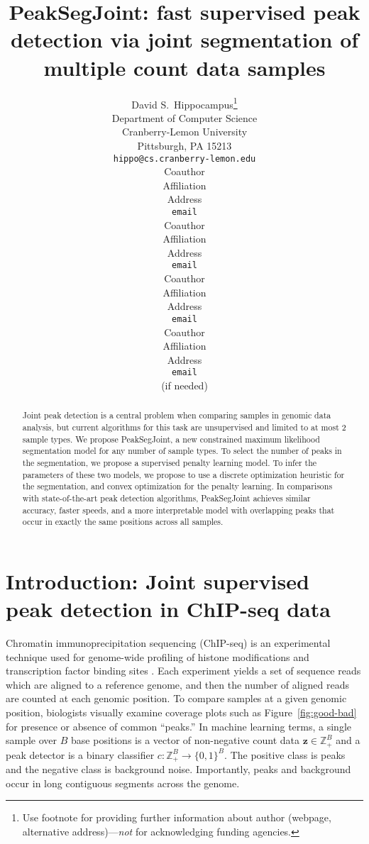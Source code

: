 \documentclass{article} %
\title{PeakSegJoint: fast supervised peak detection via joint
  segmentation of multiple count data samples}
\author{
David S.~Hippocampus\thanks{ Use footnote for providing further information
about author (webpage, alternative address)---\emph{not} for acknowledging
funding agencies.} \\
Department of Computer Science\\
Cranberry-Lemon University\\
Pittsburgh, PA 15213 \\
\texttt{hippo@cs.cranberry-lemon.edu} \\
\And
Coauthor \\
Affiliation \\
Address \\
\texttt{email} \\
\AND
Coauthor \\
Affiliation \\
Address \\
\texttt{email} \\
\And
Coauthor \\
Affiliation \\
Address \\
\texttt{email} \\
\And
Coauthor \\
Affiliation \\
Address \\
\texttt{email} \\
(if needed)\\
}
\newcommand{\ZZ}{\mathbb Z}
\begin{document}
\maketitle

\begin{abstract}
  Joint peak detection is a central problem when comparing samples in
  genomic data analysis, but current algorithms for this task are
  unsupervised and limited to at most 2 sample types. We propose
  PeakSegJoint, a new constrained maximum likelihood segmentation
  model for any number of sample types. To select the number of peaks
  in the segmentation, we propose a supervised penalty learning
  model. To infer the parameters of these two models, we propose to
  use a discrete optimization heuristic for the segmentation, and
  convex optimization for the penalty learning. In comparisons with
  state-of-the-art peak detection algorithms, PeakSegJoint achieves
  similar accuracy, faster speeds, and a more interpretable model
  with overlapping peaks that occur in exactly the same positions
  across all samples.
\end{abstract}

\section{Introduction: Joint supervised peak detection in ChIP-seq data}


Chromatin immunoprecipitation sequencing (ChIP-seq) is an experimental
technique used for genome-wide profiling of histone modifications and
transcription factor binding sites \citep{practical}. Each experiment
yields a set of sequence reads which are aligned to a reference
genome, and then the number of aligned reads are counted at each
genomic position. To compare samples at a given genomic position,
biologists visually examine coverage plots such as
Figure~\ref{fig:good-bad} for presence or absence of common ``peaks.''
In machine learning terms, a single sample over $B$ base positions is
a vector of non-negative count data $\mathbf z\in\ZZ_+^B$ and a peak
detector is a binary classifier $c:\ZZ_+^B\rightarrow\{0, 1\}^B$. The
positive class is peaks and the negative class is background
noise. Importantly, peaks and background occur in long contiguous
segments across the genome.
\end{document}
